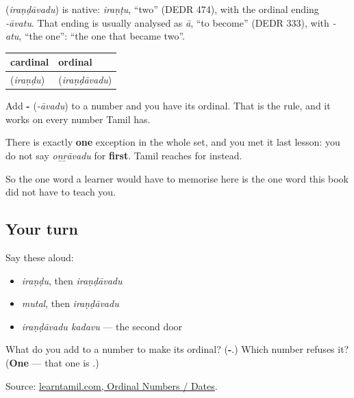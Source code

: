 \begin{cousinweb}
\textbf{} (\emph{iraṇḍāvadu}) is native: \emph{iraṇṭu}, \textquotedblleft{}two\textquotedblright{} (DEDR 474), with the ordinal ending \emph{-āvatu}. That ending is usually analysed as \emph{ā}, \textquotedblleft{}to become\textquotedblright{} (DEDR 333), with \emph{-atu}, \textquotedblleft{}the one\textquotedblright{}: \textquotedblleft{}the one that became two\textquotedblright{}.
\end{cousinweb}

\begin{grammarlens}[title={Grammar Lens: one ending, and one word that does not take it}]
\noindent
\begin{tabularx}{\linewidth}{@{}>{\raggedright\arraybackslash}X>{\raggedright\arraybackslash}X@{}}
\toprule
\textbf{cardinal} & \textbf{ordinal} \\
\midrule
\textbf{\ta{இரண்டு}} (\emph{iraṇḍu}) & \textbf{\ta{இரண்டாவது}} (\emph{iraṇḍāvadu}) \\
\bottomrule
\end{tabularx}

Add \textbf{-} (\emph{-āvadu}) to a number and you have its ordinal. That is the rule, and it works on every number Tamil has.

There is exactly \textbf{one} exception in the whole set, and you met it last lesson: you do not say \emph{oṉṟāvadu} for \textbf{first}. Tamil reaches for \textbf{} instead.

So the one word a learner would have to memorise here is the one word this book did not have to teach you.
\end{grammarlens}

\subsection*{Your turn}
Say these aloud:

\begin{itemize}
\raggedright
  \item \emph{iraṇḍu}, then \emph{iraṇḍāvadu}
  \item \emph{mutal}, then \emph{iraṇḍāvadu}
  \item \emph{iraṇḍāvadu kadavu} — the second door
\end{itemize}

\begin{tcolorbox}[breakable,colback=teal!4,colframe=teal!35!black,title={Before you move on}]
What do you add to a number to make its ordinal? (\textbf{-}.) Which number refuses it? (\textbf{One} — that one is \textbf{}.)

Source: \href{https://www.learntamil.com/part1/ch02/ordinal-numbers-dates/}{learntamil.com, Ordinal Numbers / Dates}.
\end{tcolorbox}

